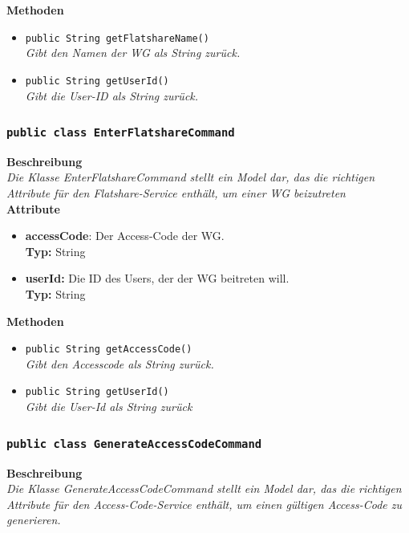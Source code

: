 \documentclass[a4paper]{scrreprt}
\begin{document}
	\textbf{Methoden}
	\begin{itemize}
		\item{\texttt{public String getFlatshareName()}}\\
		\textit{Gibt den Namen der WG als String zurück.}\\
		\item{\texttt{public String getUserId()}}\\
		\textit{Gibt die User-ID als String zurück.}\\
	\end{itemize}
	\subsubsection{\texttt{public class EnterFlatshareCommand}}
	\textbf{Beschreibung} \\
	\textit{Die Klasse EnterFlatshareCommand stellt ein Model dar, das die richtigen Attribute für den Flatshare-Service enthält, um einer WG beizutreten} \\
	
	\textbf{Attribute}
	\begin{itemize}
		\item \textbf{accessCode}: Der Access-Code der WG. \\
		\textbf{Typ:} String
		
		\item \textbf{userId:} Die ID des Users, der der WG beitreten will. \\
		\textbf{Typ:} String
	\end{itemize}
	
	\textbf{Methoden}
	\begin{itemize}
		\item{\texttt{public String getAccessCode()}}\\
		\textit{Gibt den Accesscode als String zurück.}\\
		\item{\texttt{public String getUserId()}}\\
		\textit{Gibt die User-Id als String zurück}\\
	\end{itemize}
	\subsubsection{\texttt{public class GenerateAccessCodeCommand}}
	\textbf{Beschreibung} \\
	\textit{Die Klasse GenerateAccessCodeCommand stellt ein Model dar, das die richtigen Attribute für den Access-Code-Service enthält, um einen gültigen Access-Code zu generieren.} \\
	
\end{document}
